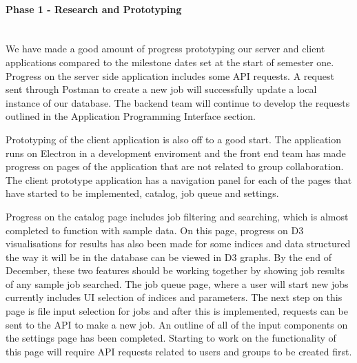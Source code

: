 \paragraph{Phase 1 - Research and Prototyping} \mbox{}\\[\paragraphheaderspace]
We have made a good amount of progress prototyping our server and client applications compared to the milestone dates set at the start of semester one. Progress on the server side application includes some API requests. A request sent through Postman to create a new job will successfully update a local instance of our database. The backend team will continue to develop the requests outlined in the Application Programming Interface section.\par
Prototyping of the client application is also off to a good start. The application runs on Electron in a development enviroment and the front end team has made progress on pages of the application that are not related to group collaboration. The client prototype application has a navigation panel for each of the pages that have started to be implemented, catalog, job queue and settings.\par
Progress on the catalog page includes job filtering and searching, which is almost completed to function with sample data. On this page, progress on D3 visualisations for results has also been made for some indices and data structured the way it will be in the database can be viewed in D3 graphs. By the end of December, these two features should be working together by showing job results of any sample job searched. The job queue page, where a user will start new jobs currently includes UI selection of indices and parameters. The next step on this page is file input selection for jobs and after this is implemented, requests can be sent to the API to make a new job. An outline of all of the input components on the settings page has been completed. Starting to work on the functionality of this page will require API requests related to users and groups to be created first.\par